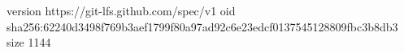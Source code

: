 version https://git-lfs.github.com/spec/v1
oid sha256:62240d3498f769b3aef1799f80a97ad92c6e23edcf0137545128809fbc3b8db3
size 1144
